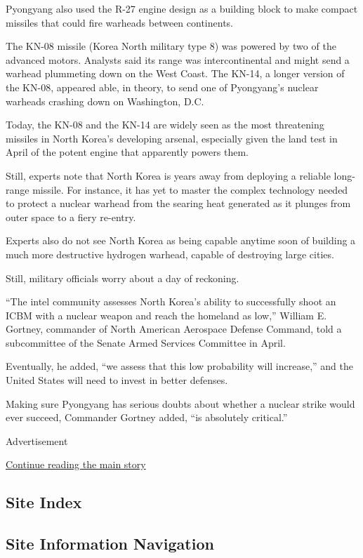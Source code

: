 Pyongyang also used the R-27 engine design as a building block to make
compact missiles that could fire warheads between continents.

The KN-08 missile (Korea North military type 8) was powered by two of
the advanced motors. Analysts said its range was intercontinental and
might send a warhead plummeting down on the West Coast. The KN-14, a
longer version of the KN-08, appeared able, in theory, to send one of
Pyongyang's nuclear warheads crashing down on Washington, D.C.

Today, the KN-08 and the KN-14 are widely seen as the most threatening
missiles in North Korea's developing arsenal, especially given the land
test in April of the potent engine that apparently powers them.

Still, experts note that North Korea is years away from deploying a
reliable long-range missile. For instance, it has yet to master the
complex technology needed to protect a nuclear warhead from the searing
heat generated as it plunges from outer space to a fiery re-entry.

Experts also do not see North Korea as being capable anytime soon of
building a much more destructive hydrogen warhead, capable of destroying
large cities.

Still, military officials worry about a day of reckoning.

``The intel community assesses North Korea's ability to successfully
shoot an ICBM with a nuclear weapon and reach the homeland as low,''
William E. Gortney, commander of North American Aerospace Defense
Command, told a subcommittee of the Senate Armed Services Committee in
April.

Eventually, he added, ``we assess that this low probability will
increase,'' and the United States will need to invest in better
defenses.

Making sure Pyongyang has serious doubts about whether a nuclear strike
would ever succeed, Commander Gortney added, ``is absolutely critical.''

Advertisement

\protect\hyperlink{after-bottom}{Continue reading the main story}

\hypertarget{site-index}{%
\subsection{Site Index}\label{site-index}}

\hypertarget{site-information-navigation}{%
\subsection{Site Information
Navigation}\label{site-information-navigation}}

